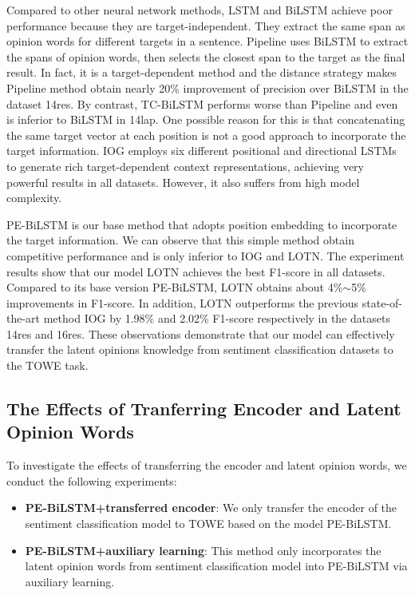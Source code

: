 \documentclass[letterpaper]{article} \usepackage{aaai20}  \usepackage{times}  \usepackage{helvet} \usepackage{courier}  \usepackage[hyphens]{url}  \usepackage{graphicx} \urlstyle{rm} \def\UrlFont{\rm}  \usepackage{graphicx}
\begin{document}
Compared to other neural network methods, LSTM and BiLSTM achieve poor performance because they are target-independent. They extract the same span as opinion words for different targets in a sentence. Pipeline uses BiLSTM to extract the spans of opinion words, then selects the closest span to the target as the final result. In fact, it is a target-dependent method and the distance strategy makes Pipeline method obtain nearly 20\% improvement of precision over BiLSTM in the dataset 14res. By contrast, TC-BiLSTM performs worse than Pipeline and even is inferior to BiLSTM in 14lap. One possible reason for this is that concatenating the same target vector at each position is not a good approach to incorporate the target information. IOG employs six different positional and directional LSTMs to generate rich target-dependent context representations, achieving very powerful results in all datasets. However, it also suffers from high model complexity.

PE-BiLSTM is our base method that adopts position embedding to incorporate the target information. We can observe that this simple method obtain competitive performance and is only inferior to IOG and LOTN. The experiment results show that our model LOTN achieves the best F1-score in all datasets. Compared to its base version PE-BiLSTM, LOTN obtains about 4\%$\sim$5\% improvements in F1-score. In addition, LOTN outperforms the previous state-of-the-art method IOG by 1.98\% and 2.02\% F1-score respectively in the datasets 14res and 16res. These observations demonstrate that our model can effectively transfer the latent opinions knowledge from sentiment classification datasets to the TOWE task.

\subsection{The Effects of Tranferring Encoder and Latent Opinion Words}
To investigate the effects of transferring the encoder and latent opinion words, we conduct the following experiments:

\begin{itemize}
	\item \textbf{PE-BiLSTM+transferred encoder}: We only transfer the encoder of the sentiment classification model to TOWE based on the model PE-BiLSTM.
	\item  \textbf{PE-BiLSTM+auxiliary learning}: This method only incorporates the latent opinion words from sentiment classification model into PE-BiLSTM via auxiliary learning.
\end{itemize}
\end{document}
